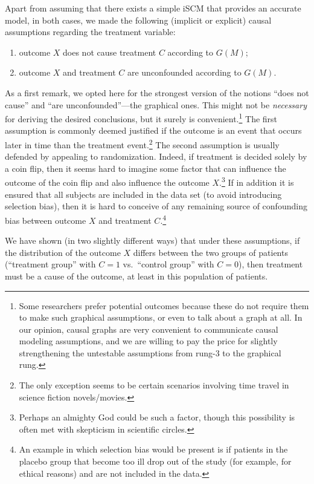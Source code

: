 Apart from assuming that there exists a simple iSCM that provides an accurate model,
in both cases, we made the following (implicit or explicit) causal assumptions regarding 
the treatment variable:
\begin{enumerate}
  \item outcome $X$ does not cause treatment $C$ according to $G(M)$;
  \item outcome $X$ and treatment $C$ are unconfounded according to $G(M)$.
\end{enumerate}
As a first remark, we opted here for the strongest version of the notions ``does not cause'' and ``are unconfounded''---the graphical ones.
This might not be \emph{necessary} for deriving the desired conclusions, but it surely is convenient.\footnote{Some researchers prefer potential outcomes because these do not require them to make such graphical assumptions, or even to talk about a graph at all. In our opinion, causal graphs are very convenient to communicate causal modeling assumptions, and we are willing to pay the price for slightly strengthening the untestable assumptions from rung-3 to the graphical rung.}
The first assumption is commonly deemed justified if the outcome is an event that occurs later in time than the treatment event.\footnote{The only exception seems to be certain scenarios involving time travel in science fiction novels/movies.}
The second assumption is usually defended by appealing to randomization.
Indeed, if treatment is decided solely by a coin flip, then it seems hard to imagine some factor that can influence the outcome of the coin flip and also influence the outcome $X$.\footnote{Perhaps an almighty God could be such a factor, though this possibility is often met with skepticism in scientific circles.}
If in addition it is ensured that all subjects are included in the data set (to avoid introducing selection bias), then it is hard to conceive of any remaining source of confounding bias between outcome $X$ and treatment $C$.\footnote{An example in which selection bias would be present is if patients in the placebo group that become too ill drop out of the study (for example, for ethical reasons) and are not included in the data.}

We have shown (in two slightly different ways) that under these assumptions, 
if the distribution of the outcome $X$ differs between the two groups of
patients (``treatment group'' with $C=1$ vs.\ ``control group'' with $C=0$), 
then treatment must be a cause of the outcome, at least in this population of patients.

